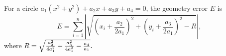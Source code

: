 \documentclass[twocolumn]{IEEEtran}
\begin{document}
For a circle $a_1 (x^2+y^2) + a_2 x + a_3 y +a_4=0$, the geometry error $E$ is 
$$E=\sum_{i=1}^{n}\left|\sqrt{(x_i+\frac{a_2}{2 a_1})^2+(y_i+\frac{a_3}{2 a_1})^2-R}\right|,$$ where $R=\sqrt{{a_2^2 \over {4 a_1^2}}+{a_3^2 \over {4 a_1^2}}-{a_4 \over a_1}}.$

%
\end{document}
